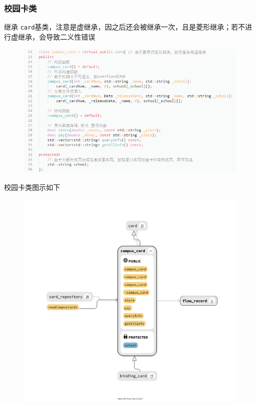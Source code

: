 \documentclass[11pt,UTF8]{ctexart}
\begin{document}
\subsubsection{校园卡类}
\par 继承 \verb'card'基类，注意是虚继承，因之后还会被继承一次，且是菱形继承；若不进行虚继承，会导致二义性错误
\begin{figure}[H]
\centering
\includegraphics[width=0.9\linewidth]{pic/campus_card.PNG}
\end{figure}
\par 校园卡类图示如下
\begin{figure}[H]
\centering
\includegraphics[width=0.8\linewidth]{pic/campus_card_class.png}
\end{figure}
\end{document}
